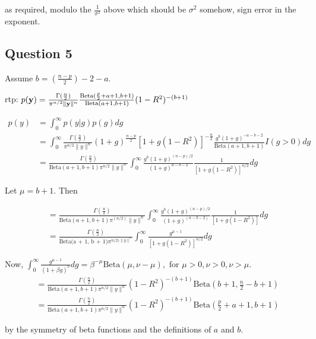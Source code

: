 \documentclass{article}[12pt]
\begin{document}
as required, modulo the $\frac{1}{\sigma^2}$ above which should be $\sigma^2$ somehow, sign error in the
exponent.

\subsection{Question 5}

Assume $b = (\frac{n - p}{2}) - 2 - a$.

rtp: $p({\bf y}) = \frac{\Gamma(\frac{n}{2})}{\pi^{n/2} \| {\bf y} \|^n} \frac{\text{Beta}(\frac{p}{2} + a + 1, b + 1)}{\text{Beta}(a + 1, b + 1)} (1 - R^2)^{-(b + 1)}$

\begin{equation*}
\begin{array}{ll}
p(y) &= \int_0^\infty p(y|g) p(g) dg \\
&= \int_0^\infty \frac{\Gamma(\frac{n}{2})}{\pi^{n/2} \| y \|^n} (1 + g)^{\frac{n - p}{2}}[1 + g(1 - R^2)]^{-\frac{n}{2}} \frac{g^b (1 + g)^{-a - b - 2}}{\text{Beta}(a + 1, b + 1)} I(g > 0) dg \\
&= \frac{\Gamma(\frac{n}{2})}{\text{Beta}(a + 1, b + 1) \pi^{n/2} \| y \|^n}
\int_0^\infty \frac{g^b (1 + g)^{(n - p)/2}}{(1 + g)^{a - b - 2}} \frac{1}{[1 + g(1 - R^2)]^{n/2}} dg
\end{array}
\end{equation*}

Let $\mu = b + 1$. Then

\begin{equation*}
\begin{array}{ll}
&=\frac{\Gamma(\frac{n}{2})}{\text{Beta}(a + 1,  b + 1) \pi^(n/2) \| y \|^n}
\int_0^\infty \frac{g^b(1 + g)^{(n - p)/2}}{(1 + g)^{(a - b - 2)}} \frac{1}{[1 + g(1 - R^2)]} dg \\
&= \frac{\Gamma(\frac{n}{2})}{\text{Beta(a + 1, b + 1)} \pi^{n/2) \| y \|^n}}
\int_0^\infty \frac{g^{\mu - 1}}{[1 + g (1 - R^2)]^{n/2}} dg
\end{array}
\end{equation*}

Now, $\int_0^\infty \frac{g^{\mu - 1}}{(1 + \beta g)^\nu} dg = \beta^{-\mu} \text{Beta}(\mu, \nu - \mu), \text{ for } \mu > 0, \nu > 0, \nu > \mu$.
\begin{equation*}
\begin{array}{ll}
&= \frac{\Gamma(\frac{n}{2})}{\text{Beta}(a + 1, b + 1) \pi^{n / 2} \| y \|^n} (1 - R^2)^{-(b + 1)} \text{Beta}(b + 1, \frac{n}{2} - b + 1) \\
&= \frac{\Gamma(\frac{n}{2})}{\text{Beta}(a + 1, b + 1) \pi^{n / 2} \| y \|^n} (1 - R^2)^{-(b + 1)} \text{Beta}(\frac{p}{2} + a + 1, b + 1)
\end{array}
\end{equation*}

by the symmetry of beta functions and the definitions of $a$ and $b$.
\end{document}
